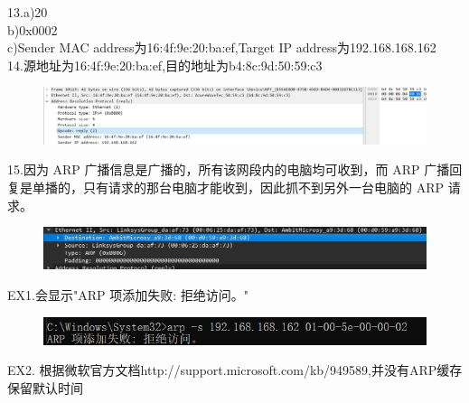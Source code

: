 \documentclass{article}
\begin{document}
13.a)20\\
   b)0x0002\\
   c)Sender MAC address为16:4f:9e:20:ba:ef,Target IP address为192.168.168.162\\

14.源地址为16:4f:9e:20:ba:ef,目的地址为b4:8c:9d:50:59:c3\\
\begin{figure}[htbp]
    \centering
    \includegraphics[width=1\textwidth]{pic/new3.png} %
\end{figure}
\newpage
15.因为 ARP 广播信息是广播的，所有该网段内的电脑均可收到，而 ARP 广播回复是单播的，只有请求的那台电脑才能收到，因此抓不到另外一台电脑的 ARP 请求。\\
\begin{figure}[htbp]
    \centering
    \includegraphics[width=1\textwidth]{pic/new4.png} %
\end{figure}

EX1.会显示"ARP 项添加失败: 拒绝访问。"\\

\begin{figure}[htbp]
    \centering
    \includegraphics[width=1\textwidth]{pic/ex2.png} %
\end{figure}

EX2. 根据微软官方文档http://support.microsoft.com/kb/949589,并没有ARP缓存保留默认时间\\
\end{document}
